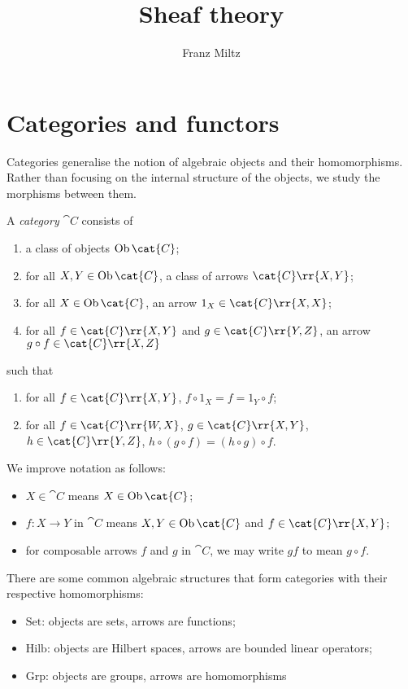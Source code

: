 \documentclass{article}
\author{Franz Miltz}
\title{Sheaf theory}
\begin{document}
\maketitle
\tableofcontents
\pagebreak

\section{Categories and functors}\label{sec:categories_and_functors}

Categories generalise the notion of algebraic objects and their homomorphisms.
Rather than focusing on the internal structure of the objects, we study the
morphisms between them.

\begin{definition}\label{def:category}
  A \emph{category} $\cat C$ consists of
  \begin{enumerate}
    \item a class of objects $\Ob\cat{C}$;
    \item for all $X,Y\in\Ob\cat{C}$, a class of arrows $\cat{C}\rr{X,Y}$;
    \item for all $X\in\Ob\cat{C}$, an arrow $1_X\in\cat{C}\rr{X,X}$;
    \item for all $f\in\cat{C}\rr{X,Y}$ and $g\in\cat{C}\rr{Y,Z}$, an arrow
      $g\circ f\in\cat{C}\rr{X,Z}$
  \end{enumerate}
  such that
  \begin{enumerate}
    \item for all $f\in\cat{C}\rr{X,Y}$, $f\circ 1_X = f = 1_Y\circ f$;
    \item for all $f\in\cat{C}\rr{W,X}$, $g\in\cat{C}\rr{X,Y}$, $h\in\cat{C}\rr{Y,Z}$,
      $h\circ(g\circ f)=(h\circ g)\circ f$.
  \end{enumerate}
\end{definition}

\begin{notation}
  We improve notation as follows:
  \begin{itemize}
    \item $X\in\cat{C}$ means $X\in\Ob\cat{C}$;
    \item $f:X\to Y$ in $\cat{C}$ means $X,Y\in\Ob\cat{C}$ and $f\in\cat{C}\rr{X,Y}$;
    \item for composable arrows $f$ and $g$ in $\cat{C}$, we may write $gf$ to mean $g\circ f$.
  \end{itemize}
\end{notation}

\begin{example}
  There are some common algebraic structures that form categories with their respective
  homomorphisms:
  \begin{itemize}
    \item $\text{Set}$: objects are sets, arrows are functions;
    \item $\text{Hilb}$: objects are Hilbert spaces, arrows are bounded linear operators;
    \item $\text{Grp}$: objects are groups, arrows are homomorphisms
  \end{itemize}
\end{example}
\end{document}
